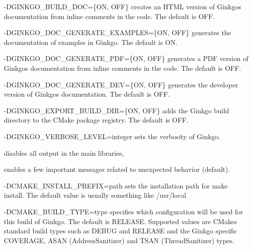 \begin{DoxyItemize}
\item {\ttfamily -\/\+D\+G\+I\+N\+K\+G\+O\+\_\+\+B\+U\+I\+L\+D\+\_\+\+D\+OC=\{ON, O\+FF\}} creates an H\+T\+ML version of Ginkgo\textquotesingle{}s documentation from inline comments in the code. The default is {\ttfamily O\+FF}.
\item {\ttfamily -\/\+D\+G\+I\+N\+K\+G\+O\+\_\+\+D\+O\+C\+\_\+\+G\+E\+N\+E\+R\+A\+T\+E\+\_\+\+E\+X\+A\+M\+P\+L\+ES=\{ON, O\+FF\}} generates the documentation of examples in Ginkgo. The default is {\ttfamily ON}.
\item {\ttfamily -\/\+D\+G\+I\+N\+K\+G\+O\+\_\+\+D\+O\+C\+\_\+\+G\+E\+N\+E\+R\+A\+T\+E\+\_\+\+P\+DF=\{ON, O\+FF\}} generates a P\+DF version of Ginkgo\textquotesingle{}s documentation from inline comments in the code. The default is {\ttfamily O\+FF}.
\item {\ttfamily -\/\+D\+G\+I\+N\+K\+G\+O\+\_\+\+D\+O\+C\+\_\+\+G\+E\+N\+E\+R\+A\+T\+E\+\_\+\+D\+EV=\{ON, O\+FF\}} generates the developer version of Ginkgo\textquotesingle{}s documentation. The default is {\ttfamily O\+FF}.
\item {\ttfamily -\/\+D\+G\+I\+N\+K\+G\+O\+\_\+\+E\+X\+P\+O\+R\+T\+\_\+\+B\+U\+I\+L\+D\+\_\+\+D\+IR=\{ON, O\+FF\}} adds the Ginkgo build directory to the C\+Make package registry. The default is {\ttfamily O\+FF}.
\item {\ttfamily -\/\+D\+G\+I\+N\+K\+G\+O\+\_\+\+V\+E\+R\+B\+O\+S\+E\+\_\+\+L\+E\+V\+EL=integer} sets the verbosity of Ginkgo.
\begin{DoxyItemize}
\item {} disables all output in the main libraries,
\item {} enables a few important messages related to unexpected behavior (default).
\end{DoxyItemize}
\item {\ttfamily -\/\+D\+C\+M\+A\+K\+E\+\_\+\+I\+N\+S\+T\+A\+L\+L\+\_\+\+P\+R\+E\+F\+IX=path} sets the installation path for {\ttfamily make install}. The default value is usually something like {\ttfamily /usr/local}
\item {\ttfamily -\/\+D\+C\+M\+A\+K\+E\+\_\+\+B\+U\+I\+L\+D\+\_\+\+T\+Y\+PE=type} specifies which configuration will be used for this build of Ginkgo. The default is {\ttfamily R\+E\+L\+E\+A\+SE}. Supported values are C\+Make\textquotesingle{}s standard build types such as {\ttfamily D\+E\+B\+UG} and {\ttfamily R\+E\+L\+E\+A\+SE} and the Ginkgo specific {\ttfamily C\+O\+V\+E\+R\+A\+GE}, {\ttfamily A\+S\+AN} (Address\+Sanitizer) and {\ttfamily T\+S\+AN} (Thread\+Sanitizer) types.

\end{DoxyItemize}
